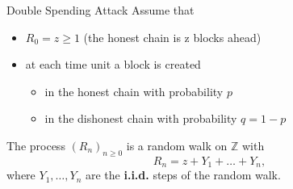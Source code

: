 \documentclass{beamer}
\begin{document}
\begin{frame}{Double Spending Attack}
\footnotesize
Assume that
\begin{itemize}
\item $R_0=z\geq1$ (the honest chain is z blocks ahead)
\item at each time unit a block is created
\begin{itemize}
  \footnotesize
\item[$\hookrightarrow$] in the honest chain with probability $p$
\item[$\hookrightarrow$] in the dishonest chain with probability $q=1-p$
\end{itemize}
\end{itemize}
The process $(R_n)_{n\geq0}$ is a random walk on $\mathbb{Z}$ with
$$R_n=z+Y_1+\ldots+Y_n,$$
where $Y_1,\ldots,Y_n$ are the \textbf{i.i.d.} steps of the random walk. 

\end{frame}
\end{document}
